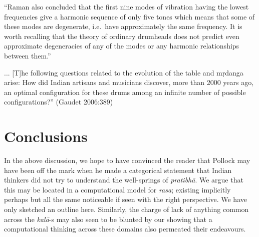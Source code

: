 \begin{myquote}
“Raman also concluded that the first nine modes of vibration having the lowest frequencies give a harmonic sequence of only five tones which means that some of these modes are degenerate, i.e.\ have approximately the same frequency. It is worth recalling that the theory of ordinary drumheads does not predict even approximate degeneracies of any of the modes or any harmonic relationships between them.” 

... [T]he following questions related to the evolution of the table and mṛdanga arise: How did Indian artisans and musicians discover, more than 2000 years ago, an optimal configuration for these drums among an infinite number of possible configurations?” 
\hfill (Gaudet 2006:389)
\end{myquote}

\section{Conclusions}\label{chap3-sec6}

In the above discussion, we hope to have convinced the reader that Pollock may have been off the mark when he made a categorical statement that Indian thinkers did not try to understand the well-springs of \textsl{pratibhā}. We argue that this may be located in a computational model for \textsl{rasa}; existing implicitly perhaps but all the same noticeable if seen with the right perspective. We have only sketched an outline here. Similarly, the charge of lack of anything common across the \textsl{kalā}-s may also seen to be blunted by our showing that a computational thinking across these domains also permeated their endeavours.\\[-21pt]


